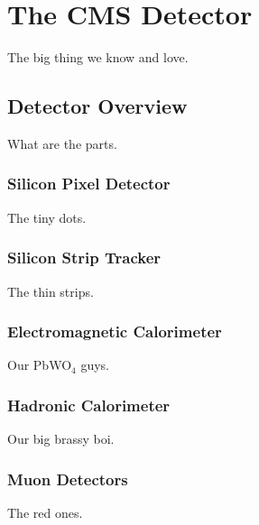 \chapter{The CMS Detector}

The big thing we know and love.

\section{Detector Overview}

What are the parts.

\subsection{Silicon Pixel Detector}

The tiny dots.

\subsection{Silicon Strip Tracker}

The thin strips.

\subsection{Electromagnetic Calorimeter}

Our PbWO$_{4}$ guys.

\subsection{Hadronic Calorimeter}

Our big brassy boi.

\subsection{Muon Detectors}

The red ones.



